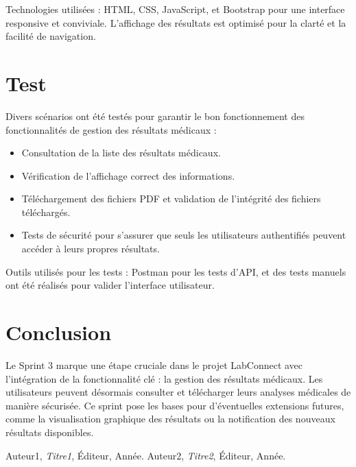 \documentclass[12pt,a4paper]{report}
\begin{document}
Technologies utilisées : HTML, CSS, JavaScript, et Bootstrap pour une interface responsive et conviviale. L'affichage des résultats est optimisé pour la clarté et la facilité de navigation.

\section{Test}

Divers scénarios ont été testés pour garantir le bon fonctionnement des fonctionnalités de gestion des résultats médicaux :

\begin{itemize}
    \item Consultation de la liste des résultats médicaux.
    \item Vérification de l'affichage correct des informations.
    \item Téléchargement des fichiers PDF et validation de l’intégrité des fichiers téléchargés.
    \item Tests de sécurité pour s'assurer que seuls les utilisateurs authentifiés peuvent accéder à leurs propres résultats.
\end{itemize}

Outils utilisés pour les tests : Postman pour les tests d’API, et des tests manuels ont été réalisés pour valider l'interface utilisateur.

\section{Conclusion}

Le Sprint 3 marque une étape cruciale dans le projet LabConnect avec l'intégration de la fonctionnalité clé : la gestion des résultats médicaux. Les utilisateurs peuvent désormais consulter et télécharger leurs analyses médicales de manière sécurisée. Ce sprint pose les bases pour d'éventuelles extensions futures, comme la visualisation graphique des résultats ou la notification des nouveaux résultats disponibles.


\begin{thebibliography}{9}
 Auteur1, \textit{Titre1}, Éditeur, Année.
 Auteur2, \textit{Titre2}, Éditeur, Année.
\end{thebibliography}
\end{document}
